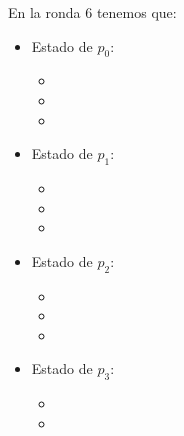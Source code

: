 En la ronda 6 tenemos que:

\begin{multicols}{2}
\begin{itemize}
\item Estado de $p_0$:
      \begin{itemize}
      \item {}
      
      \item {}
      
      \item {}
      \end{itemize}
      
\item Estado de $p_1$:
      \begin{itemize}
      \item {}
      
      \item {}
      
      \item {}
      \end{itemize}

\item Estado de $p_2$:
      \begin{itemize}
      \item {}
      
      \item {}
      
      \item {}
      \end{itemize}

\item Estado de $p_3$:
      \begin{itemize}
      \item {}
      
      \item {}
      

\end{itemize}
\end{itemize}
\end{multicols}

